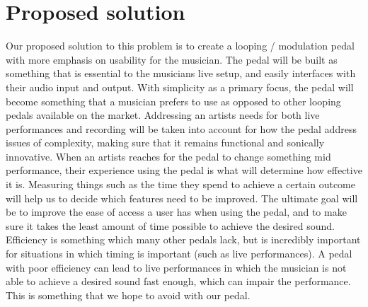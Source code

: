 \documentclass[onecolumn, draftclsnofoot,10pt, compsoc]{IEEEtran}
\begin{document}
\section{Proposed solution}
Our proposed solution to this problem is to create a looping / modulation pedal with more emphasis on usability for the musician. The pedal will be built as something that is essential to the musicians live setup, and easily interfaces with their audio input and output. With simplicity as a primary focus, the pedal will become something that a musician prefers to use as opposed to other looping pedals available on the market. Addressing an artists needs for both live performances and recording will be taken into account for how the pedal address issues of complexity, making sure that it remains functional and sonically innovative. When an artists reaches for the pedal to change something mid performance, their experience using the pedal is what will determine how effective it is. Measuring things such as the time they spend to achieve a certain outcome will help us to decide which features need to be improved. The ultimate goal will be to improve the ease of access a user has when using the pedal, and to make sure it takes the least amount of time possible to achieve the desired sound. Efficiency is something which many other pedals lack, but is incredibly important for situations in which timing is important (such as live performances). A pedal with poor efficiency can lead to live performances in which the musician is not able to achieve a desired sound fast enough, which can impair the performance. This is something that we hope to avoid with our pedal. 
\end{document}
